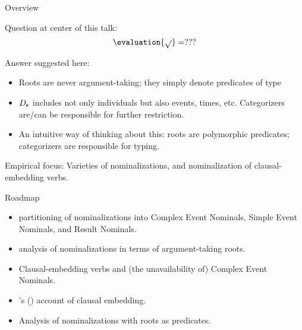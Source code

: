 \documentclass[twocolumn,landscape,12pt,paper=a4,DIV=15]{ling-handout}
\begin{document}
\begin{frame}{Overview}

  \begin{block}{Question at center of this talk:}
    \[
      \evaluation{\dmroot{}} = ???
    \]
  \end{block}

  \begin{block}{Answer suggested here:}

    \begin{itemize}

      \item Roots are never argument-taking; they simply denote predicates of type 

      \item $D_{\mathsf{e}}$ includes not only individuals but also events,
        times, etc. Categorizers are/can be responsible for further restriction.

      \item An intuitive way of thinking about this: roots are polymorphic
        predicates; categorizers are responsible for typing.

    \end{itemize}

  \end{block}

\end{frame}

\begin{frame}

  \begin{block}{Empirical focus:}
    Varieties of nominalizations, and nominalization of clausal-embedding verbs.
  \end{block}


  \begin{block}{Roadmap}
    \begin{itemize}
    \item {} partitioning of
      nominalizations into Complex Event Nominals, Simple Event Nominals, and
      Result Nominals.
      \item {} analysis of nominalizations in terms of
        argument-taking roots.
      \item Clausal-embedding verbs and (the unavailability of) Complex Event
        Nominals.
      \item \citeauthor{elliott2016}'s (\citeyear{elliott2016,elliott2017_sub})
        account of clausal embedding.
      \item Analysis of nominalizations with roots as predicates.
    \end{itemize}
  \end{block}

\end{frame}


\printbibliography

\end{document}

